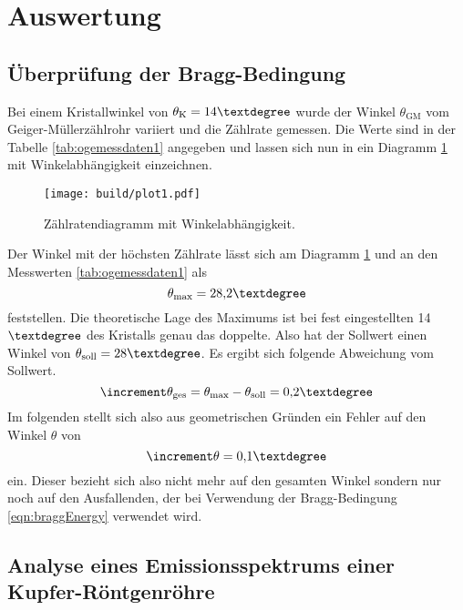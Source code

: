 \section{Auswertung}

\subsection{Überprüfung der Bragg-Bedingung}

Bei einem Kristallwinkel von $\theta_{\text{K}} = 14{\textdegree}$ wurde der Winkel $\theta_{\text{GM}}$ vom Geiger-Müllerzählrohr variiert und die Zählrate gemessen.
Die Werte sind in der Tabelle \ref{tab:ogemessdaten1} angegeben und lassen sich nun in ein Diagramm \ref{fig:plot1} mit Winkelabhängigkeit einzeichnen.
\begin{figure}[h]
  \centering
  \texttt{[image: build/plot1.pdf]}
  \caption{Zählratendiagramm mit Winkelabhängigkeit.}
  \label{fig:plot1}
\end{figure}
Der Winkel mit der höchsten Zählrate lässt sich am Diagramm \ref{fig:plot1} und an den Messwerten \ref{tab:ogemessdaten1} als
\begin{equation*}
\theta_{\text{max}} = 28{,}2{\textdegree}
\end{equation*}
feststellen.
Die theoretische Lage des Maximums ist bei fest eingestellten 14$\textdegree$ des Kristalls genau das doppelte. Also hat der Sollwert einen Winkel von $\theta_{\text{soll}} = 28{\textdegree}$. Es ergibt sich folgende Abweichung vom Sollwert.
\begin{equation*}
\increment \theta_{\text{ges}} = \theta_{\text{max}} - \theta_{\text{soll}} = 0{,}2{\textdegree}
\end{equation*}
Im folgenden stellt sich also aus geometrischen Gründen ein Fehler auf den Winkel $\theta$ von
\begin{equation}
\label{eqn:fehlerwinkel}
\increment \theta = 0{,}1{\textdegree}
\end{equation}
ein. Dieser bezieht sich also nicht mehr auf den gesamten Winkel sondern nur noch auf den Ausfallenden, der bei Verwendung der Bragg-Bedingung \eqref{eqn:braggEnergy}
verwendet wird.

\subsection{Analyse eines Emissionsspektrums einer Kupfer-Röntgenröhre}

